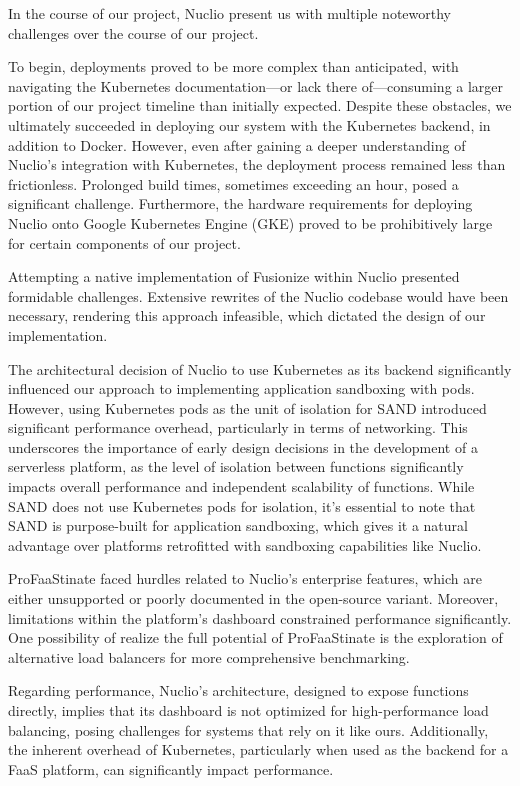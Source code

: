 In the course of our project, Nuclio present us with multiple noteworthy
challenges over the course of our project.

To begin, deployments proved to be more complex than anticipated, with
navigating the Kubernetes documentation—or lack there of—consuming a larger
portion of our project timeline than initially expected. Despite these
obstacles, we ultimately succeeded in deploying our system with the Kubernetes
backend, in addition to Docker. However, even after gaining a deeper
understanding of Nuclio's integration with Kubernetes, the deployment process
remained less than frictionless. Prolonged build times, sometimes exceeding an
hour, posed a significant challenge. Furthermore, the hardware requirements for
deploying Nuclio onto Google Kubernetes Engine (GKE) proved to be prohibitively
large for certain components of our project.

Attempting a native implementation of Fusionize within Nuclio presented
formidable challenges. Extensive rewrites of the Nuclio codebase would have been
necessary, rendering this approach infeasible, which dictated the design of our
implementation.

The architectural decision of Nuclio to use Kubernetes as its backend
significantly influenced our approach to implementing application sandboxing
with pods. However, using Kubernetes pods as the unit of isolation for SAND
introduced significant performance overhead, particularly in terms of
networking. This underscores the importance of early design decisions in the
development of a serverless platform, as the level of isolation between
functions significantly impacts overall performance and independent scalability
of functions. While SAND does not use Kubernetes pods for isolation, it's
essential to note that SAND is purpose-built for application sandboxing, which
gives it a natural advantage over platforms retrofitted with sandboxing
capabilities like Nuclio.

ProFaaStinate faced hurdles related to Nuclio's enterprise features, which are
either unsupported or poorly documented in the open-source variant. Moreover,
limitations within the platform's dashboard constrained performance
significantly. One possibility of realize the full potential of ProFaaStinate is
the exploration of alternative load balancers for more comprehensive
benchmarking.

Regarding performance, Nuclio's architecture, designed to expose functions
directly, implies that its dashboard is not optimized for high-performance load
balancing, posing challenges for systems that rely on it like ours.
Additionally, the inherent overhead of Kubernetes, particularly when used as the
backend for a FaaS platform, can significantly impact performance.

